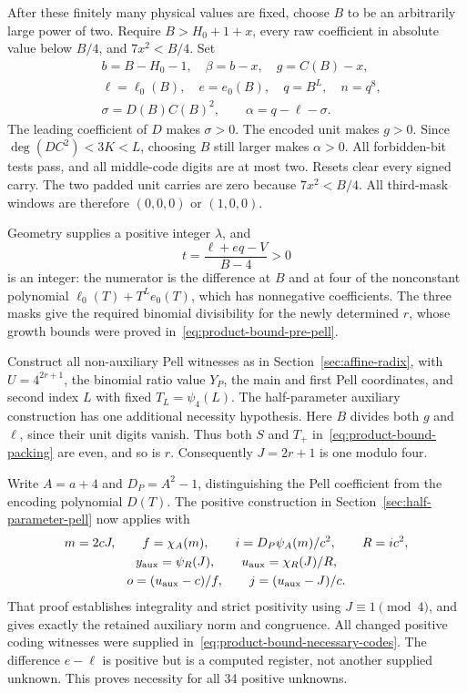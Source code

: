 After these finitely many physical values are fixed, choose $B$ to
be an arbitrarily large power of two. Require $B>H_0+1+x$, every
raw coefficient in absolute value below $B/4$, and $7x^2<B/4$.
Set
\begin{equation}\label{eq:product-bound-necessary-codes}
\begin{aligned}
 &b=B-H_0-1,\quad \beta=b-x,\quad g=C(B)-x,\\
 &\ell=\ell_0(B),\quad e=e_0(B),\quad q=B^L,\quad n=q^8,\\
 &\sigma=D(B)C(B)^2,\qquad \alpha=q-\ell-\sigma.
\end{aligned}
\end{equation}
The leading coefficient of $D$ makes $\sigma>0$. The encoded unit
makes $g>0$. Since $\deg(D C^2)<3K<L$, choosing $B$ still larger
makes $\alpha>0$. All forbidden-bit tests pass, and all middle-code
digits are at most two. Resets clear every signed carry. The two
padded unit carries are zero because $7x^2<B/4$. All third-mask
windows are therefore $(0,0,0)$ or $(1,0,0)$.

Geometry supplies a positive integer $\lambda$, and
\[
 t=\frac{\ell+eq-V}{B-4}>0
\]
is an integer: the numerator is the difference at $B$ and at four
of the nonconstant polynomial $\ell_0(T)+T^Le_0(T)$, which has
nonnegative coefficients. The three masks give the required binomial
divisibility for the newly determined $r$, whose growth bounds were
proved in~\eqref{eq:product-bound-pre-pell}.

Construct all non-auxiliary Pell witnesses as in
Section~\ref{sec:affine-radix}, with $U=4^{2r+1}$, the binomial
ratio value $Y_P$, the main and first Pell coordinates, and second
index $L$ with fixed $T_L=\psi_4(L)$. The half-parameter auxiliary
construction has one additional necessity hypothesis. Here $B$
divides both $g$ and $\ell$, since their unit digits vanish. Thus
both $S$ and $T_+$ in~\eqref{eq:product-bound-packing} are even,
and so is $r$. Consequently $J=2r+1$ is one modulo four.

Write $A=a+4$ and $D_P=A^2-1$, distinguishing the Pell coefficient
from the encoding polynomial $D(T)$. The positive construction in
Section~\ref{sec:half-parameter-pell} now applies with
\begin{equation}\label{eq:product-bound-auxiliary-witnesses}
\begin{gathered}
 m=2cJ,\qquad f=\chi_A(m),\qquad
 i=D_P\psi_A(m)/c^2,\qquad R=ic^2,\\
 y_{\rm aux}=\psi_R(J),\qquad
 u_{\rm aux}=\chi_R(J)/R,\\
 o=(u_{\rm aux}-c)/f,\qquad
 j=(u_{\rm aux}-J)/c.
\end{gathered}
\end{equation}
That proof establishes integrality and strict positivity using
$J\equiv1\pmod4$, and gives exactly the retained auxiliary norm
and congruence. All changed positive coding witnesses were supplied
in~\eqref{eq:product-bound-necessary-codes}. The difference $e-\ell$
is positive but is a computed register, not another supplied unknown.
This proves necessity for all 34 positive unknowns.

